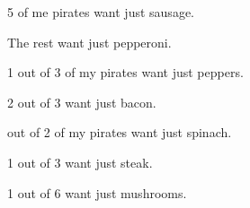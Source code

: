 \documentclass{article}
\begin{document}
\Huge
5 of me pirates want just sausage.

The rest want just pepperoni.
\begin{center}
\end{center}

\newpage

1 out of 3 of my pirates want just peppers.

  2 out of 3 want just bacon.
\begin{center}
\end{center}

 out of 2 of my pirates want just spinach.

  1 out of 3 want just steak.

  1 out of 6 want just mushrooms.
\begin{center}
\end{center}
\end{document}
